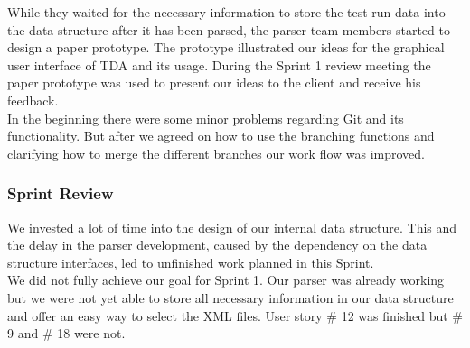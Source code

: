 While they waited for the necessary information to store the test run data into the data structure after it has been parsed, the parser team members started to design a paper prototype. The prototype illustrated our ideas for the graphical user interface of TDA and its usage. During the Sprint 1 review meeting the paper prototype was used to present our ideas to the client and receive his feedback. \\ 

In the beginning there were some minor problems regarding Git and its functionality. But after we agreed on how to use the branching functions and clarifying how to merge the different branches our work flow was improved. \\ 


\subsubsection*{Sprint Review}

We invested a lot of time into the design of our internal data structure. This and the delay in the parser development, caused by the dependency on the data structure interfaces, led to unfinished work planned in this Sprint. \\

We did not fully achieve our goal for Sprint 1. Our parser was already working but we were not yet able to store all necessary information in our data structure and offer an easy way to select the XML files. User story \# 12 was finished but \# 9 and \# 18 were not. \\ 


